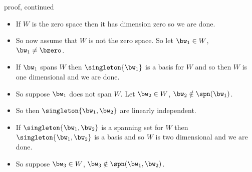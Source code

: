 \documentclass{beamer}
\begin{document}
\begin{frame}{proof, continued}

\begin{itemize}
\item If $W$ is the zero space then it has dimension zero so we are done.
\item So now assume that $W$ is not the zero space. So let $\bw_1\in W$, $\bw_1\not=\bzero$.
\item If $\bw_1$ spans $W$ then $\singleton{\bw_1}$ is a basis for $W$ and so then $W$ is one dimensional and we are done.
\item So suppose $\bw_1$ does not span $W$. Let $\bw_2\in W$, $\bw_2\notin\spn(\bw_1)$.
\item So then $\singleton{\bw_1,\bw_2}$ are linearly independent.
\item If $\singleton{\bw_1,\bw_2}$ is a spanning set for $W$ then  $\singleton{\bw_1,\bw_2}$ is a basis and
so $W$ is two dimensional and we are done.
\item So suppose $\bw_3\in W$, $\bw_3\notin\spn(\bw_1,\bw_2)$.
\end{itemize}

\end{frame}
\end{document}
